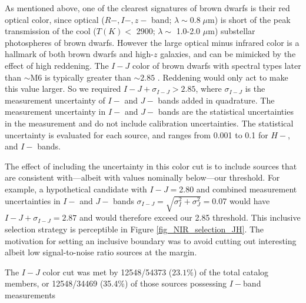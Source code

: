 As mentioned above, one of the clearest signatures of brown dwarfs is their red optical color, since optical  ($R-,I-, z-$ band; $\lambda \sim  0.8 \; \mu$m) is short of the peak transmission of the cool ($T(K) <$ 2900; $\lambda \sim$ 1.0-2.0 $\mu$m) substellar photospheres of brown dwarfs.  However the large optical minus infrared color is a hallmark of both brown dwarfs and high-$z$ galaxies, and can be mimicked by the effect of high reddening.  The $I-J$ color of brown dwarfs with spectral types later than $\sim$M6 is typically greater than $\sim2.85$ \citep{allers06}.  Reddening would only act to make this value larger.  So we required $I-J +\sigma_{I-J} > 2.85$, where $\sigma_{I-J}$ is the measurement uncertainty of $I-$ and $J-$ bands added in quadrature.  The measurement uncertainty in $I-$ and $J-$ bands are the statistical uncertainties in the measurement and do not include calibration uncertainties.  The statistical uncertainty is evaluated for each source, and ranges from 0.001 to 0.1 for $H-$, and $I-$ bands.

The effect of including the uncertainty in this color cut is to include sources that are consistent with---albeit with values nominally below---our threshold.  For example, a hypothetical candidate with $I-J=$2.80 and combined measurement uncertainties in $I-$ and $J-$ bands $\sigma_{I-J} = \sqrt{\sigma^2_{I}+\sigma^2_{J}}=$0.07 would have $I-J + \sigma_{I-J} = 2.87$ and would therefore exceed our 2.85 threshold.  This inclusive selection strategy is perceptible in Figure \ref{fig_NIR_selection_JH}.  The motivation for setting an inclusive boundary was to avoid cutting out interesting albeit low signal-to-noise ratio sources at the margin.

The $I-J$ color cut was met by 12548/54373 ($23.1\%$) of the total catalog members, or 12548/34469 (35.4\%) of those sources possessing $I-$band measurements

